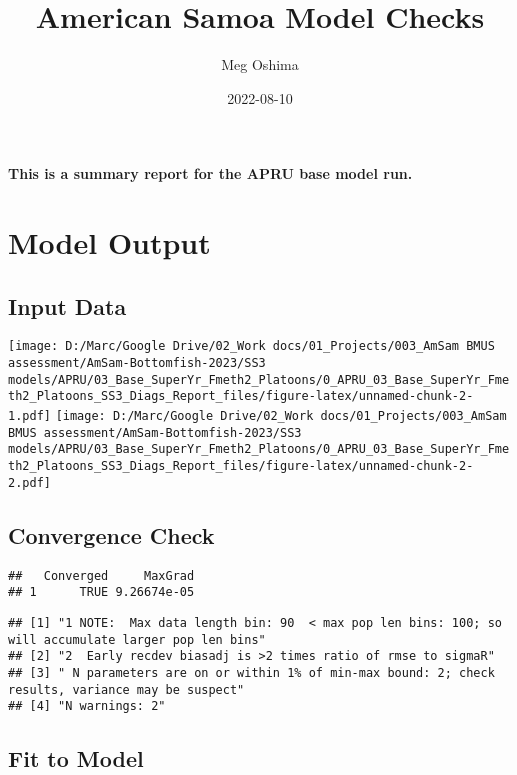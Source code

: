 \documentclass[
]{article}
\title{American Samoa Model Checks}
\author{Meg Oshima}
\date{2022-08-10}
\begin{document}
\maketitle

\textbf{This is a summary report for the APRU base model run.}

\hypertarget{model-output}{%
\section{Model Output}\label{model-output}}

\hypertarget{input-data}{%
\subsection{Input Data}\label{input-data}}

\texttt{[image: D:/Marc/Google Drive/02\_Work docs/01\_Projects/003\_AmSam BMUS assessment/AmSam-Bottomfish-2023/SS3 models/APRU/03\_Base\_SuperYr\_Fmeth2\_Platoons/0\_APRU\_03\_Base\_SuperYr\_Fmeth2\_Platoons\_SS3\_Diags\_Report\_files/figure-latex/unnamed-chunk-2-1.pdf]}
\texttt{[image: D:/Marc/Google Drive/02\_Work docs/01\_Projects/003\_AmSam BMUS assessment/AmSam-Bottomfish-2023/SS3 models/APRU/03\_Base\_SuperYr\_Fmeth2\_Platoons/0\_APRU\_03\_Base\_SuperYr\_Fmeth2\_Platoons\_SS3\_Diags\_Report\_files/figure-latex/unnamed-chunk-2-2.pdf]}

\hypertarget{convergence-check}{%
\subsection{Convergence Check}\label{convergence-check}}

\begin{verbatim}
##   Converged     MaxGrad
## 1      TRUE 9.26674e-05
\end{verbatim}

\begin{verbatim}
## [1] "1 NOTE:  Max data length bin: 90  < max pop len bins: 100; so will accumulate larger pop len bins"
## [2] "2  Early recdev biasadj is >2 times ratio of rmse to sigmaR"                                      
## [3] " N parameters are on or within 1% of min-max bound: 2; check results, variance may be suspect"    
## [4] "N warnings: 2"
\end{verbatim}

\hypertarget{fit-to-model}{%
\subsection{Fit to Model}\label{fit-to-model}}
\end{document}
